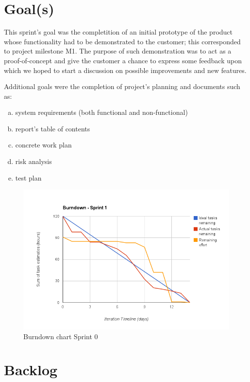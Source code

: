 \section{Goal(s)}

This sprint's goal was the completition of an initial prototype of the product whose functionality
had to be demonstrated to the customer; this corresponded to project milestone M1.
The purpose of such demonstration was to act as a proof-of-concept and give the customer
a chance to express some feedback upon which we hoped to start a discussion
on possible improvements and new features.

Additional goals were the completion of project's planning and documents such as:
\begin{enumerate}[a)]
\item system requirements (both functional and non-functional)
\item report's table of contents
\item concrete work plan
\item risk analysis
\item test plan
\end{enumerate}

\begin{figure}[h]
\centering
\includegraphics[scale=0.60]{../Figures/burndownSprint1.png}
\caption{Burndown chart Sprint 0}
\label{figure:burndownsprint0}
\end{figure}

\newpage
\section{Backlog}

